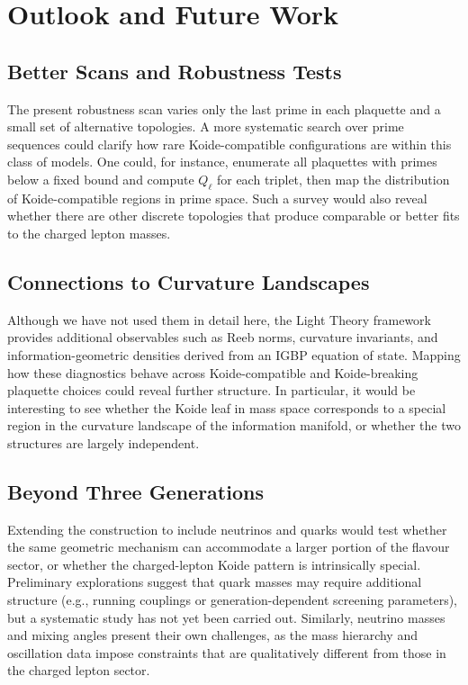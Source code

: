 \documentclass[12pt]{article}
\begin{document}
\section{Outlook and Future Work}
\label{sec:outlook}

\subsection{Better Scans and Robustness Tests}

The present robustness scan varies only the last prime in each plaquette and
a small set of alternative topologies.  A more systematic search over prime
sequences could clarify how rare Koide-compatible configurations are within
this class of models.  One could, for instance, enumerate all plaquettes with
primes below a fixed bound and compute $Q_\ell$ for each triplet, then map
the distribution of Koide-compatible regions in prime space.  Such a survey
would also reveal whether there are other discrete topologies that produce
comparable or better fits to the charged lepton masses.

\subsection{Connections to Curvature Landscapes}

Although we have not used them in detail here, the Light Theory framework
provides additional observables such as Reeb norms, curvature invariants, and
information-geometric densities derived from an IGBP equation of state.
Mapping how these diagnostics behave across Koide-compatible and
Koide-breaking plaquette choices could reveal further structure.  In
particular, it would be interesting to see whether the Koide leaf in mass
space corresponds to a special region in the curvature landscape of the
information manifold, or whether the two structures are largely independent.

\subsection{Beyond Three Generations}

Extending the construction to include neutrinos and quarks would test whether
the same geometric mechanism can accommodate a larger portion of the flavour
sector, or whether the charged-lepton Koide pattern is intrinsically special.
Preliminary explorations suggest that quark masses may require additional
structure (e.g., running couplings or generation-dependent screening
parameters), but a systematic study has not yet been carried out.  Similarly,
neutrino masses and mixing angles present their own challenges, as the mass
hierarchy and oscillation data impose constraints that are qualitatively
different from those in the charged lepton sector.
\end{document}
